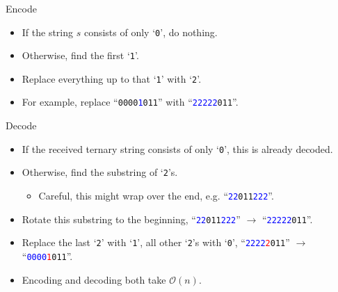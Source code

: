 \begin{frame}
    \frametitle{\problemtitle}
    \begin{block}{Encode}
        \begin{itemize}
            \item If the string $s$ consists of only `\texttt{0}', do nothing.
            \item Otherwise, find the first `\texttt{1}'.
            \item Replace everything up to that `\texttt{1}' with `\texttt{2}'.
            \item For example, replace ``\texttt{0000\textcolor{blue}{1}011}'' with ``\texttt{\textcolor{blue}{22222}011}''.
      \end{itemize}
    \end{block}{}

    \begin{block}{Decode}
        \begin{itemize}
            \item If the received ternary string consists of only `\texttt{0}', this is already decoded.
            \pause
            \item Otherwise, find the substring of `\texttt{2}'s.
            \begin{itemize}
                \item Careful, this might wrap over the end, e.g. ``\texttt{\textcolor{blue}{22}011\textcolor{blue}{222}}''.
            \end{itemize}
            \pause
            \item Rotate this substring to the beginning, ``\texttt{\textcolor{blue}{22}011\textcolor{blue}{222}}'' $\to$ ``\texttt{\textcolor{blue}{22222}011}''.
            \pause
            \item Replace the last `\texttt{2}' with `\texttt{1}', all other `\texttt{2}'s with `\texttt{0}', ``\texttt{\textcolor{blue}{2222}\textcolor{red}{2}011}'' $\to$ ``\texttt{\textcolor{blue}{0000}\textcolor{red}{1}011}''.
            \pause
            \item Encoding and decoding both take $\mathcal{O}(n)$.
        \end{itemize}
    \end{block}
\end{frame}
